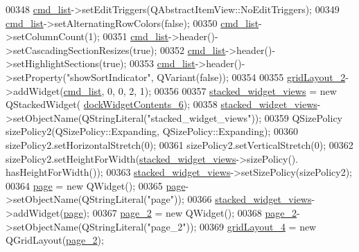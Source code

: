 \begin{DoxyCode}
00348         \hyperlink{a00080_aa66ece71395b435e915d384fb63bac1d}{cmd\_list}->setEditTriggers(QAbstractItemView::NoEditTriggers);
00349         \hyperlink{a00080_aa66ece71395b435e915d384fb63bac1d}{cmd\_list}->setAlternatingRowColors(\textcolor{keyword}{false});
00350         \hyperlink{a00080_aa66ece71395b435e915d384fb63bac1d}{cmd\_list}->setColumnCount(1);
00351         \hyperlink{a00080_aa66ece71395b435e915d384fb63bac1d}{cmd\_list}->header()->setCascadingSectionResizes(\textcolor{keyword}{true});
00352         \hyperlink{a00080_aa66ece71395b435e915d384fb63bac1d}{cmd\_list}->header()->setHighlightSections(\textcolor{keyword}{true});
00353         \hyperlink{a00080_aa66ece71395b435e915d384fb63bac1d}{cmd\_list}->header()->setProperty(\textcolor{stringliteral}{"showSortIndicator"}, QVariant(\textcolor{keyword}{false}));
00354 
00355         \hyperlink{a00080_a6b2a0c5f7e8ff2a87134908dd770d2d2}{gridLayout\_2}->addWidget(\hyperlink{a00080_aa66ece71395b435e915d384fb63bac1d}{cmd\_list}, 0, 0, 2, 1);
00356 
00357         \hyperlink{a00080_a59e39bd3d716004e840a5be5dda18b96}{stacked\_widget\_views} = \textcolor{keyword}{new} QStackedWidget(
      \hyperlink{a00080_a23b450a9debad2b0fecc6f063772caf2}{dockWidgetContents\_6});
00358         \hyperlink{a00080_a59e39bd3d716004e840a5be5dda18b96}{stacked\_widget\_views}->setObjectName(QStringLiteral(\textcolor{stringliteral}{"stacked\_widget\_views"}));
00359         QSizePolicy sizePolicy2(QSizePolicy::Expanding, QSizePolicy::Expanding);
00360         sizePolicy2.setHorizontalStretch(0);
00361         sizePolicy2.setVerticalStretch(0);
00362         sizePolicy2.setHeightForWidth(\hyperlink{a00080_a59e39bd3d716004e840a5be5dda18b96}{stacked\_widget\_views}->sizePolicy().
      hasHeightForWidth());
00363         \hyperlink{a00080_a59e39bd3d716004e840a5be5dda18b96}{stacked\_widget\_views}->setSizePolicy(sizePolicy2);
00364         \hyperlink{a00080_ad7d164376bef8649ee1f94697b859417}{page} = \textcolor{keyword}{new} QWidget();
00365         \hyperlink{a00080_ad7d164376bef8649ee1f94697b859417}{page}->setObjectName(QStringLiteral(\textcolor{stringliteral}{"page"}));
00366         \hyperlink{a00080_a59e39bd3d716004e840a5be5dda18b96}{stacked\_widget\_views}->addWidget(\hyperlink{a00080_ad7d164376bef8649ee1f94697b859417}{page});
00367         \hyperlink{a00080_adcb6de4cebc6760fe319711f125010cc}{page\_2} = \textcolor{keyword}{new} QWidget();
00368         \hyperlink{a00080_adcb6de4cebc6760fe319711f125010cc}{page\_2}->setObjectName(QStringLiteral(\textcolor{stringliteral}{"page\_2"}));
00369         \hyperlink{a00080_a8ee86315639f324b17708efc7dbe8b19}{gridLayout\_4} = \textcolor{keyword}{new} QGridLayout(\hyperlink{a00080_adcb6de4cebc6760fe319711f125010cc}{page\_2});

\end{DoxyCode}
